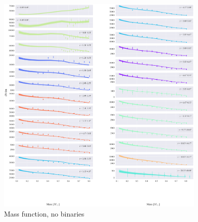 
\begin{figure}
	\begin{center}
		\includegraphics[width=0.9\textwidth]{figures/prev_nobin/mass_fun.png}
	\end{center}
	\caption{Mass function, no binaries}
	\label{fig:nobin_mass_fun}
\end{figure}


